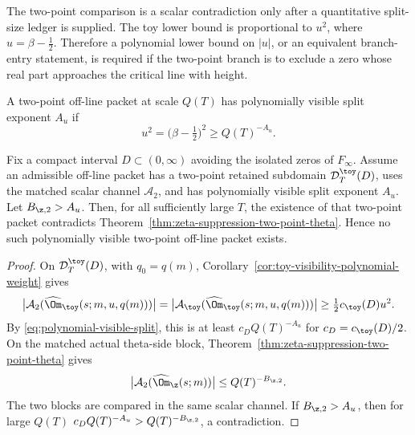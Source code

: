The two-point comparison is a scalar contradiction only after a quantitative
split-size ledger is supplied.  The toy lower bound is proportional to
\(u^2\), where \(u=\beta-\tfrac12\).  Therefore a polynomial lower bound on
\(|u|\), or an equivalent branch-entry statement, is required if the two-point
branch is to exclude a zero whose real part approaches the critical line with
height.

\begin{definition}
\label{def:polynomially-visible-two-point-split}
A two-point off-line packet at scale \(Q(T)\) has polynomially visible split
exponent \(A_u\) if
\begin{equation}
\label{eq:polynomial-visible-split}
        u^2=\bigl(\beta-\tfrac12\bigr)^2\ge Q(T)^{-A_u}.
\end{equation}
\end{definition}

\begin{theorem}
\label{thm:two-point-rigidity}
Fix a compact interval \(D\subset(0,\infty)\) avoiding the isolated zeros of
\(F_\infty\).  Assume an admissible off-line packet has a two-point retained
subdomain \(\mathcal D_T^\toy(D)\), uses the matched scalar channel
\(\mathcal A_2\), and has polynomially visible split exponent \(A_u\).
Let \(B_{\z,2}>A_u\).  Then, for all sufficiently large \(T\), the
existence of that two-point packet contradicts
Theorem~\ref{thm:zeta-suppression-two-point-theta}.  Hence no such
polynomially visible two-point off-line packet exists.
\end{theorem}

\begin{proof}
On \(\mathcal D_T^\toy(D)\), with \(q_0=q(m)\),
Corollary~\ref{cor:toy-visibility-polynomial-weight} gives
\[
        \bigl|\mathcal A_2(\widehat\Om_\toy(s;m,u,q(m)))\bigr|
        =\bigl|\mathcal A_\toy(\widehat\Om_\toy(s;m,u,q(m)))\bigr|
        \ge \tfrac12 c_\toy(D)u^2.
\]
By \eqref{eq:polynomial-visible-split}, this is at least
\(c_DQ(T)^{-A_u}\) for \(c_D=c_\toy(D)/2\).  On the matched actual theta-side
block, Theorem~\ref{thm:zeta-suppression-two-point-theta} gives
\[
        \bigl|\mathcal A_2(\widehat\Om_\z(s;m))\bigr|
        \le Q(T)^{-B_{\z,2}}.
\]
The two blocks are compared in the same scalar channel.  If
\(B_{\z,2}>A_u\), then for large \(Q(T)\)
\(c_DQ(T)^{-A_u}>Q(T)^{-B_{\z,2}}\), a contradiction.
\end{proof}

